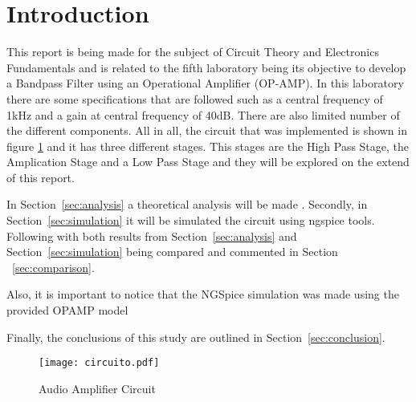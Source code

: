 \section{Introduction}
\label{sec:introduction}


\hspace{0,5cm} This report is being made for the subject of Circuit Theory and Electronics Fundamentals and is related to the fifth laboratory being its objective to develop a Bandpass Filter using an Operational Amplifier (OP-AMP). In this laboratory there are some specifications that are followed such as a central frequency of 1kHz and a gain at central frequency of 40dB. There are also limited number of the different components. All in all, the circuit that was implemented is shown in figure \ref{fig:circuito} and it has three different stages. This stages are the High Pass Stage, the Amplication Stage and a Low Pass Stage and they will be explored on the extend of this report.
\par In Section~\ref{sec:analysis} a theoretical analysis will be made . Secondly, in Section~\ref{sec:simulation} it will be simulated the circuit using ngspice tools. Following with both results from Section~\ref{sec:analysis} and Section~\ref{sec:simulation} being compared and commented in Section ~\ref{sec:comparison}. 
\par Also, it is important to notice that the NGSpice simulation was made using the provided OPAMP model
\par Finally, the conclusions of this study are outlined in Section~\ref{sec:conclusion}.

\begin{figure}[H] \centering
\texttt{[image: circuito.pdf]}
\caption{Audio Amplifier Circuit}
\label{fig:circuito}
\end{figure}


